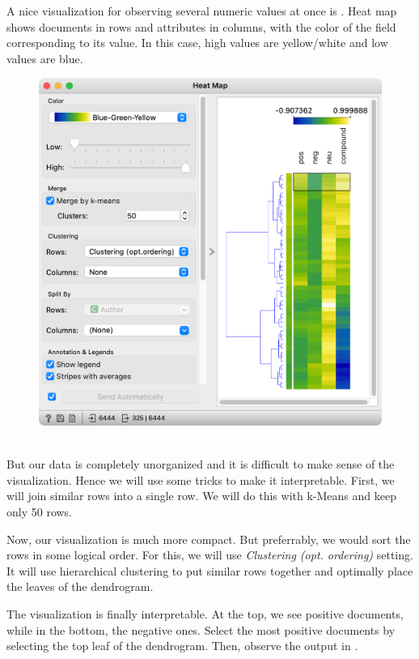 A nice visualization for observing several numeric values at once is . Heat map shows documents in rows and attributes in columns, with the color of the field corresponding to its value. In this case, high values are yellow/white and low values are blue.

\begin{figure}
    \includegraphics[scale=0.45]{heat-map.png}
    \caption{$\;$}
\end{figure}

But our data is completely unorganized and it is difficult to make sense of the visualization. Hence we will use some tricks to make it interpretable. First, we will join similar rows into a single row. We will do this with k-Means and keep only 50 rows.

Now, our visualization is much more compact. But preferrably, we would sort the rows in some logical order. For this, we will use \emph{Clustering (opt. ordering)} setting. It will use hierarchical clustering to put similar rows together and optimally place the leaves of the dendrogram.

The visualization is finally interpretable. At the top, we see positive documents, while in the bottom, the negative ones. Select the most positive documents by selecting the top leaf of the dendrogram. Then, observe the output in .

